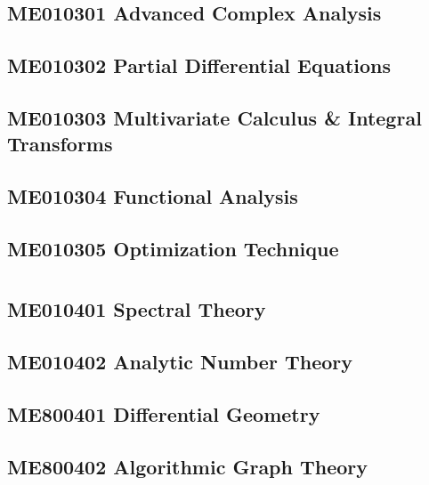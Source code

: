 \documentclass[a4paper,10pt,openany]{book}
\begin{document}
\part{}
\chapter{ME010301 Advanced Complex Analysis}

\chapter{ME010302 Partial Differential Equations}

\chapter{ME010303 Multivariate Calculus \& Integral Transforms}

\chapter{ME010304 Functional Analysis}

\chapter{ME010305 Optimization Technique}


\part{}
\chapter{ME010401 Spectral Theory}

\chapter{ME010402 Analytic Number Theory}


\chapter{ME800401 Differential Geometry}

\chapter{ME800402 Algorithmic Graph Theory}

\end{document}
